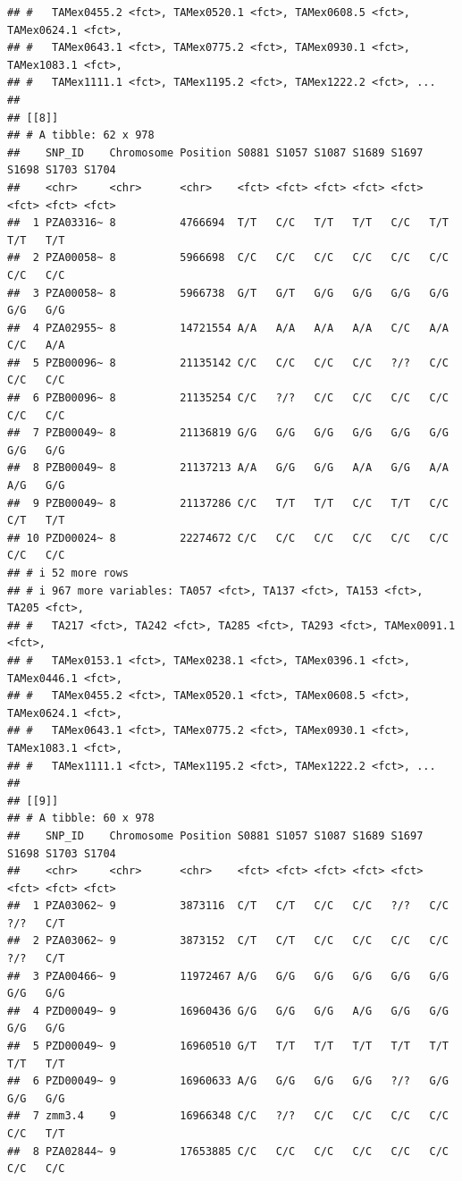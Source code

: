 \documentclass[
]{article}
\begin{document}
\begin{verbatim}
## #   TAMex0455.2 <fct>, TAMex0520.1 <fct>, TAMex0608.5 <fct>, TAMex0624.1 <fct>,
## #   TAMex0643.1 <fct>, TAMex0775.2 <fct>, TAMex0930.1 <fct>, TAMex1083.1 <fct>,
## #   TAMex1111.1 <fct>, TAMex1195.2 <fct>, TAMex1222.2 <fct>, ...
## 
## [[8]]
## # A tibble: 62 x 978
##    SNP_ID    Chromosome Position S0881 S1057 S1087 S1689 S1697 S1698 S1703 S1704
##    <chr>     <chr>      <chr>    <fct> <fct> <fct> <fct> <fct> <fct> <fct> <fct>
##  1 PZA03316~ 8          4766694  T/T   C/C   T/T   T/T   C/C   T/T   T/T   T/T  
##  2 PZA00058~ 8          5966698  C/C   C/C   C/C   C/C   C/C   C/C   C/C   C/C  
##  3 PZA00058~ 8          5966738  G/T   G/T   G/G   G/G   G/G   G/G   G/G   G/G  
##  4 PZA02955~ 8          14721554 A/A   A/A   A/A   A/A   C/C   A/A   C/C   A/A  
##  5 PZB00096~ 8          21135142 C/C   C/C   C/C   C/C   ?/?   C/C   C/C   C/C  
##  6 PZB00096~ 8          21135254 C/C   ?/?   C/C   C/C   C/C   C/C   C/C   C/C  
##  7 PZB00049~ 8          21136819 G/G   G/G   G/G   G/G   G/G   G/G   G/G   G/G  
##  8 PZB00049~ 8          21137213 A/A   G/G   G/G   A/A   G/G   A/A   A/G   G/G  
##  9 PZB00049~ 8          21137286 C/C   T/T   T/T   C/C   T/T   C/C   C/T   T/T  
## 10 PZD00024~ 8          22274672 C/C   C/C   C/C   C/C   C/C   C/C   C/C   C/C  
## # i 52 more rows
## # i 967 more variables: TA057 <fct>, TA137 <fct>, TA153 <fct>, TA205 <fct>,
## #   TA217 <fct>, TA242 <fct>, TA285 <fct>, TA293 <fct>, TAMex0091.1 <fct>,
## #   TAMex0153.1 <fct>, TAMex0238.1 <fct>, TAMex0396.1 <fct>, TAMex0446.1 <fct>,
## #   TAMex0455.2 <fct>, TAMex0520.1 <fct>, TAMex0608.5 <fct>, TAMex0624.1 <fct>,
## #   TAMex0643.1 <fct>, TAMex0775.2 <fct>, TAMex0930.1 <fct>, TAMex1083.1 <fct>,
## #   TAMex1111.1 <fct>, TAMex1195.2 <fct>, TAMex1222.2 <fct>, ...
## 
## [[9]]
## # A tibble: 60 x 978
##    SNP_ID    Chromosome Position S0881 S1057 S1087 S1689 S1697 S1698 S1703 S1704
##    <chr>     <chr>      <chr>    <fct> <fct> <fct> <fct> <fct> <fct> <fct> <fct>
##  1 PZA03062~ 9          3873116  C/T   C/T   C/C   C/C   ?/?   C/C   ?/?   C/T  
##  2 PZA03062~ 9          3873152  C/T   C/T   C/C   C/C   C/C   C/C   ?/?   C/T  
##  3 PZA00466~ 9          11972467 A/G   G/G   G/G   G/G   G/G   G/G   G/G   G/G  
##  4 PZD00049~ 9          16960436 G/G   G/G   G/G   A/G   G/G   G/G   G/G   G/G  
##  5 PZD00049~ 9          16960510 G/T   T/T   T/T   T/T   T/T   T/T   T/T   T/T  
##  6 PZD00049~ 9          16960633 A/G   G/G   G/G   G/G   ?/?   G/G   G/G   G/G  
##  7 zmm3.4    9          16966348 C/C   ?/?   C/C   C/C   C/C   C/C   C/C   T/T  
##  8 PZA02844~ 9          17653885 C/C   C/C   C/C   C/C   C/C   C/C   C/C   C/C  

\end{verbatim}
\end{document}
